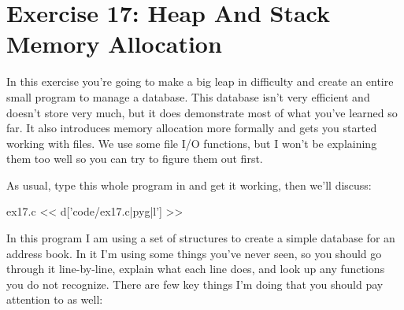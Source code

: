 \chapter{Exercise 17: Heap And Stack Memory Allocation}

In this exercise you're going to make a big leap in difficulty and create
an entire small program to manage a database.  This database isn't very
efficient and doesn't store very much, but it does demonstrate most of
what you've learned so far.  It also introduces memory allocation more
formally and gets you started working with files.  We use some file I/O
functions, but I won't be explaining them too well so you can try to
figure them out first.

As usual, type this whole program in and get it working, then we'll discuss:

\begin{code}{ex17.c}
<< d['code/ex17.c|pyg|l'] >>
\end{code}

In this program I am using a set of structures to create a simple
database for an address book.  In it I'm using some things you've never
seen, so you should go through it line-by-line, explain what each line
does, and look up any functions you do not recognize.  There are few
key things I'm doing that you should pay attention to as well:


